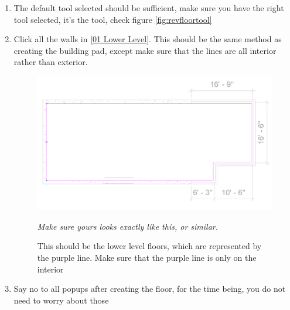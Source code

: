 \documentclass{tufte-book} %
\begin{document}
\begin{enumerate}
	\item The default tool selected should be sufficient, make sure you have the right tool selected, it's the  tool, check figure \ref{fig:revfloortool}
	\item Click all the walls in \ref{01 Lower Level}. This should be the same method as creating the building pad, except make sure that the lines are all interior rather than exterior.
	
	\begin{figure}
		\includegraphics[width=\linewidth]{revitlowerlevelfloor.png}
		\caption[Lower level floors]{This should be the lower level floors, which are represented by the purple line. Make sure that the purple line is only on the interior}
		\emph{Make sure yours looks exactly like this, or similar.}
	\end{figure}
	
	\item Say no to all popups after creating the floor, for the time being, you do not need to worry about those

\end{enumerate}
\end{document}

